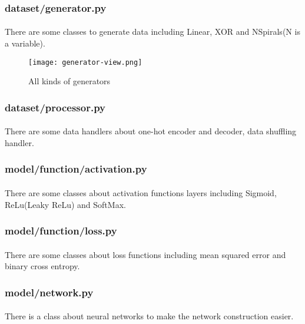 \subsubsection{dataset/generator.py}
\paragraph{}
There are some classes to generate data including Linear, XOR and NSpirals(N is a variable).
\begin{figure}[!ht]
\begin{center} 
\texttt{[image: generator-view.png]} 
\caption{All kinds of generators}
\end{center} 
\end{figure} 
\subsubsection{dataset/processor.py}
\paragraph{}
There are some data handlers about one-hot encoder and decoder, data shuffling handler.
\subsubsection{model/function/activation.py}
\paragraph{}
There are some classes about activation functions layers including Sigmoid, ReLu(Leaky ReLu) and SoftMax.
\subsubsection{model/function/loss.py}
\paragraph{}
There are some classes about loss functions including mean squared error and binary cross entropy.
\subsubsection{model/network.py}
\paragraph{}
There is a class about neural networks to make the network construction easier.
